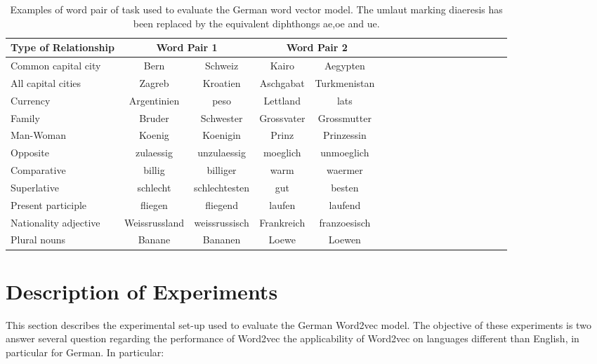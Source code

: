 \begin{table}[h]
  \centering
  \caption{Examples of word pair  of task  used  to evaluate the German word
    vector model. The umlaut marking diaeresis has been replaced by the
    equivalent diphthongs ae,oe and ue.   \textit{} }
  \label{tab:task_deutsch_modified}

  \begin{tabular}{ |l| |c|*{4}{c| |c| c | c }  }

  \hline           
  Type of Relationship &  \multicolumn{2}{c||}{Word Pair 1} &
  \multicolumn{2}{c|}{Word Pair 2} \\  \hline           
  Common capital city & Bern &  Schweiz & Kairo  & Aegypten \\ 
  All capital cities  & Zagreb &  Kroatien & Aschgabat & Turkmenistan  \\
  Currency & Argentinien & peso  & Lettland  & lats \\ 
  Family & Bruder & Schwester  & Grossvater & Grossmutter \\
  Man-Woman & Koenig & Koenigin  &  Prinz & Prinzessin   \\  \hline  
  Opposite & zulaessig & unzulaessig & moeglich & unmoeglich \\  
  Comparative & billig & billiger & warm & waermer \\  
  Superlative & schlecht & schlechtesten & gut & besten \\  
  Present participle & fliegen & fliegend & laufen & laufend \\  
  Nationality adjective & Weissrussland & weissrussisch & Frankreich  & franzoesisch  \\  
  Plural nouns  & Banane & Bananen & Loewe & Loewen \\
  \hline
\end{tabular}
\end{table}



\section{Description of Experiments}
\label{sec:german_eng_experiments}

This section describes the experimental set-up used to evaluate the German
Word2vec model. The objective of these experiments is two answer several
question regarding the performance of Word2vec the applicability of Word2vec
on languages different than  English,  in particular for German.  In
particular:

